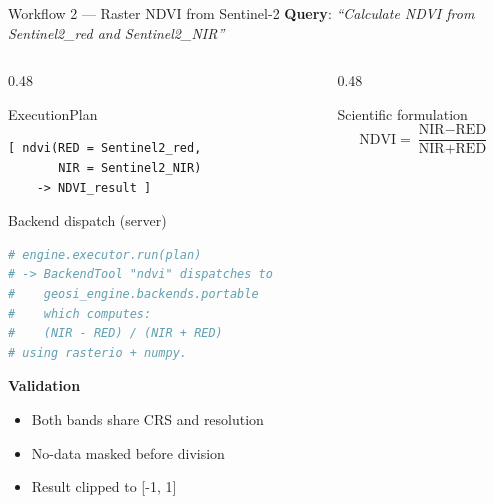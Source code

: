 \documentclass[aspectratio=169,11pt]{beamer}
\begin{document}
\begin{frame}{Workflow 2 --- Raster NDVI from Sentinel-2}
  \small
  \textbf{Query}: \emph{``Calculate NDVI from Sentinel2\_red and Sentinel2\_NIR''}

  \vspace{0.3em}
  \begin{columns}[T,onlytextwidth]
    \begin{column}{0.48\textwidth}
      \begin{block}{ExecutionPlan}
\begin{lstlisting}
[ ndvi(RED = Sentinel2_red,
       NIR = Sentinel2_NIR)
    -> NDVI_result ]
\end{lstlisting}
      \end{block}
      \begin{block}{Backend dispatch (server)}
\begin{lstlisting}[language=Python]
# engine.executor.run(plan)
# -> BackendTool "ndvi" dispatches to
#    geosi_engine.backends.portable
#    which computes:
#    (NIR - RED) / (NIR + RED)
# using rasterio + numpy.
\end{lstlisting}
      \end{block}
      \small\textbf{Validation}
      \begin{itemize}
        \item Both bands share CRS and resolution
        \item No-data masked before division
        \item Result clipped to [-1, 1]
      \end{itemize}
    \end{column}
    \begin{column}{0.48\textwidth}
      \begin{block}{Scientific formulation}
        \[
          \text{NDVI} = \frac{\text{NIR} - \text{RED}}{\text{NIR} + \text{RED}}
        \]
      \end{block}
      \centering
\end{column}
\end{columns}
\end{frame}
\end{document}

